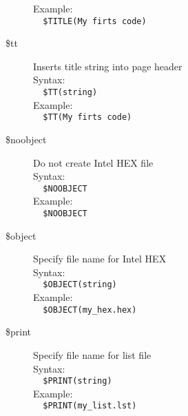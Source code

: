 \documentclass[a4paper,twoside,12pt]{book}
\begin{document}
\begin{description}
				Example:\\
				\verb'  '{\color{highlight_control}\verb'$TITLE'}{\color{highlight_symbol}\verb'('}{\color{highlight_string}\verb'My firts code'}{\color{highlight_symbol}\verb')'}\\
			\item[\$tt] Inserts title string into page header\\
				Syntax:\\
				\verb'  '{\color{highlight_control}\verb'$TT'}{\color{highlight_symbol}\verb'('}{\color{highlight_string}\verb'string'}{\color{highlight_symbol}\verb')'}\\
				Example:\\
				\verb'  '{\color{highlight_control}\verb'$TT'}{\color{highlight_symbol}\verb'('}{\color{highlight_string}\verb'My firts code'}{\color{highlight_symbol}\verb')'}\\
			\item[\$noobject] Do not create Intel HEX file\\
				Syntax:\\
				\verb'  '{\color{highlight_control}\verb'$NOOBJECT'}\\
				Example:\\
				\verb'  '{\color{highlight_control}\verb'$NOOBJECT'}\\
			\item[\$object] Specify file name for Intel HEX\\
				Syntax:\\
				\verb'  '{\color{highlight_control}\verb'$OBJECT'}{\color{highlight_symbol}\verb'('}{\color{highlight_string}\verb'string'}{\color{highlight_symbol}\verb')'}\\
				Example:\\
				\verb'  '{\color{highlight_control}\verb'$OBJECT'}{\color{highlight_symbol}\verb'('}{\color{highlight_string}\verb'my_hex.hex'}{\color{highlight_symbol}\verb')'}\\
			\item[\$print] Specify file name for list file\\
				Syntax:\\
				\verb'  '{\color{highlight_control}\verb'$PRINT'}{\color{highlight_symbol}\verb'('}{\color{highlight_string}\verb'string'}{\color{highlight_symbol}\verb')'}\\
				Example:\\
				\verb'  '{\color{highlight_control}\verb'$PRINT'}{\color{highlight_symbol}\verb'('}{\color{highlight_string}\verb'my_list.lst'}{\color{highlight_symbol}\verb')'}\\

\end{description}
\end{document}
